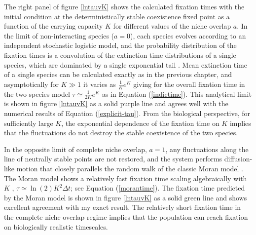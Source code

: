 The right panel of figure \ref{lntauvK} shows the calculated fixation times with the initial condition at the deterministically stable coexistence fixed point as a function of the carrying capacity $K$ for different values of the niche overlap $a$. 
In the limit of non-interacting species ($a=0$), each species evolves according to an independent stochastic logistic model, and the  probability distribution of the fixation times is a convolution of the extinction time distributions of a single species, which are dominated by a single exponential tail \cite{Norden1982,Hanggi1990,Ovaskainen2010}. 
Mean extinction time of a single species can be calculated exactly as in the previous chapter, and asymptotically for $K\gg 1$ it varies as $\frac{1}{K} e^K$ \cite{Lande1993} giving for the overall fixation time in the two species model  $\tau \simeq \frac{1}{2K} e^K$ as in Equation (\ref{indietime}).
This analytical limit is shown in figure \ref{lntauvK} as a solid purple line and agrees well with the numerical results of Equation (\ref{explicit-tau}). 
From the biological perspective, for sufficiently large $K$, the exponential dependence of the fixation time on $K$ implies that the fluctuations do not destroy the stable coexistence of the two species. %

In the opposite limit of complete niche overlap, $a=1$, any fluctuations along the line of neutrally stable points are not restored, and the system performs diffusion-like motion that closely parallels the random walk of the classic Moran model \cite{Antal2006,Chotibut2015,Dobrinevski2012,Fisher2014,Constable2015,Lin2012,Kessler2007,Young2018}. 
The Moran model shows a relatively fast fixation time scaling algebraically with $K$ \cite{Moran1962,Lin2012}, $\tau \simeq \ln(2) K^2 \Delta t$; see Equation (\ref{morantime}). 
The fixation time predicted by the Moran model is shown in figure \ref{lntauvK} as a solid green line and shows excellent agreement with my exact result. 
The relatively short fixation time in the complete niche overlap regime implies that the population can reach fixation on biologically realistic timescales. 

